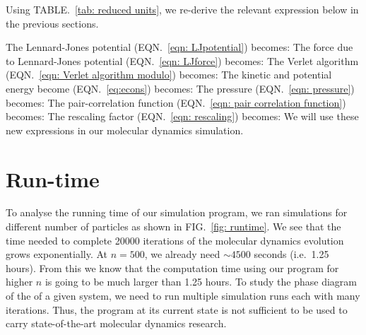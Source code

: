 \documentclass[pra,aps,superscriptaddress,amssymb,amsmath,reprint,noeprint,floatfix]{revtex4-2}
\begin{document}
Using TABLE.\ \ref{tab: reduced units}, we re-derive the relevant expression below in the previous sections.

The Lennard-Jones potential (EQN.\ \ref{eqn: LJpotential}) becomes:
\REDUCEDLJpotential
The force due to Lennard-Jones potential (EQN.\ \ref{eqn: LJforce}) becomes:
\REDUCEDLJforce
The Verlet algorithm (EQN.\ \ref{eqn: Verlet algorithm modulo}) becomes:
\REDUCEDVerletalgomod
The kinetic and potential energy become (EQN.\ \ref{eq:econs}) becomes:
\REDUCEDPEequalKE
The pressure (EQN.\ \ref{eqn: pressure}) becomes:
\REDUCEDpressure
The pair-correlation function (EQN.\ \ref{eqn: pair correlation function}) becomes:
\REDUCEDpaircorr
The rescaling factor (EQN.\ \ref{eqn: rescaling}) becomes:
\REDUCEDrescaling
We will use these new expressions in our molecular dynamics simulation.

\section{\label{subsec: Run-time}Run-time}
To analyse the running time of our simulation program, we ran simulations for different number of particles as shown in FIG.\ \ref{fig: runtime}.
\figruntime
We see that the time needed to complete 20000 iterations of the molecular dynamics evolution grows exponentially. At $n=500$, we already need $\sim{4500}$ seconds (i.e.\ 1.25 hours). From this we know that the computation time using our program for higher $n$ is going to be much larger than 1.25 hours. To study the phase diagram of the of a given system, we need to run multiple simulation runs each with many iterations. Thus, the program at its current state is not sufficient to be used to carry state-of-the-art molecular dynamics research.


\end{document}
